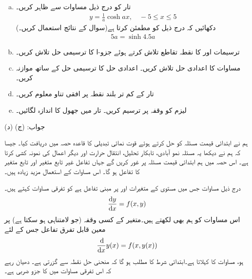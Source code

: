 \begin{enumerate}[a.]
\item
تار کو درج ذیل مساوات سے ظاہر کریں۔
\begin{align*}
y=\frac{1}{a}\cosh ax,\quad -5\le x\le 5
\end{align*}
دکھائیں کہ  درج ذیل کو مطمئن کرتا ہے(سوال  کے نتائج استعمال کریں۔)
\begin{align}\label{مساوات_ماورائی_لیزم}
5a=\sinh 4.5a
\end{align}
\item
 ترسیمات  اور   کا نقطہ تقاطع تلاش کرتے ہوئے جزو-ا کا ترسیمی حل تلاش کریں۔
\item
مساوات  کا اعدادی حل تلاش کریں۔ اعدادی حل کا ترسیمی حل کے ساتھ موازنہ کریں۔
\item
تار کے کم تر بلند نقطہ پر افقی تناو معلوم کریں۔
\item
لیزم  کو وقفہ  پر ترسیم کریں۔ تار میں جھول کا اندازہ لگائیں۔
\end{enumerate}
جواب:\quad
(ج)  (د) 

ہم نے ابتدائی قیمت مسئلہ  کو حل کرتے ہوئے قوت نمائی تبدیلی  کا قاعدہ حصہ  میں دریافت کیا۔ جیسا کہ ہم نے دیکھا یہ مسئلہ نمو آبادی، تابکار تحلیل، انتقال حرارت اور دیگر اعمال کی نمونہ کشی کرتا ہے۔ اس حصہ میں ہم ابتدائی قیمت مسئلہ  پر غور کریں گے جہاں تفاعل  غیر تابع متغیر  اور تابع متغیر  کا تفاعل ہو گا۔ اس مساوات کے استعمال مزید زیادہ ہیں۔

درج ذیل مساوات جس میں  مستوی  کے متغیرات  اور  پر مبنی تفاعل  ہے کو  تفرقی مساوات کہتے ہیں۔
\begin{align}\label{مساوات_ماورائی_یک_رتبی_تفرقی_الف}
\frac{\dif y}{\dif x}=f(x,y)
\end{align}
اس مساوات کو ہم  بھی لکھتے ہیں۔متغیر  کے کسی وقفہ (جو لامتناہی ہو سکتا ہے) پر معین قابل تفرق تفاعل  جس کے لئے
\begin{align*}
\frac{\dif}{\dif x}y(x)=f(x,y(x))
\end{align*}
ہو، مساوات  کا  کہلاتا ہے۔ابتدائی شرط  کا مطلب ہو گا کہ منحنی حل  نقطہ  سے گزرتی ہے۔ دھیان رہے کہ اس تفرقی مساوات میں  کا جزو ضربی  ہے۔

